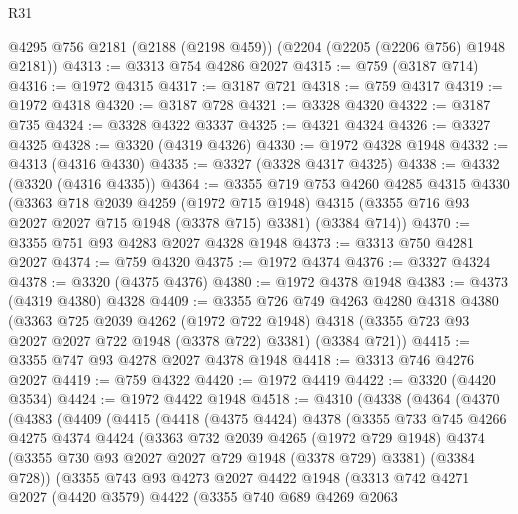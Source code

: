 \begin{lexlean}{R31}
\begin{coremodule}
    @4295
    @756
    @2181
    (@2188 (@2198 @459))
    (@2204 (@2205 (@2206 @756) @1948 @2181))
@4313 := @3313 @754 @4286 @2027
@4315 := @759 (@3187 @714)
@4316 := @1972 @4315
@4317 := @3187 @721
@4318 := @759 @4317
@4319 := @1972 @4318
@4320 := @3187 @728
@4321 := @3328 @4320
@4322 := @3187 @735
@4324 := @3328 @4322 @3337
@4325 := @4321 @4324
@4326 := @3327 @4325
@4328 := @3320 (@4319 @4326)
@4330 := @1972 @4328 @1948
@4332 := @4313 (@4316 @4330)
@4335 := @3327 (@3328 @4317 @4325)
@4338 := @4332 (@3320 (@4316 @4335))
@4364 := @3355
    @719
    @753
    @4260
    @4285
    @4315
    @4330
    (@3363
      @718
      @2039
      @4259
      (@1972 @715 @1948)
      @4315
      (@3355 @716 @93 @2027 @2027 @715 @1948 (@3378 @715) @3381)
      (@3384 @714))
@4370 := @3355 @751 @93 @4283 @2027 @4328 @1948
@4373 := @3313 @750 @4281 @2027
@4374 := @759 @4320
@4375 := @1972 @4374
@4376 := @3327 @4324
@4378 := @3320 (@4375 @4376)
@4380 := @1972 @4378 @1948
@4383 := @4373 (@4319 @4380) @4328
@4409 := @3355
    @726
    @749
    @4263
    @4280
    @4318
    @4380
    (@3363
      @725
      @2039
      @4262
      (@1972 @722 @1948)
      @4318
      (@3355 @723 @93 @2027 @2027 @722 @1948 (@3378 @722) @3381)
      (@3384 @721))
@4415 := @3355 @747 @93 @4278 @2027 @4378 @1948
@4418 := @3313 @746 @4276 @2027
@4419 := @759 @4322
@4420 := @1972 @4419
@4422 := @3320 (@4420 @3534)
@4424 := @1972 @4422 @1948
@4518 := @4310
    (@4338
      (@4364
        (@4370
          (@4383
            (@4409
              (@4415
                (@4418
                  (@4375 @4424)
                  @4378
                  (@3355
                    @733
                    @745
                    @4266
                    @4275
                    @4374
                    @4424
                    (@3363
                      @732
                      @2039
                      @4265
                      (@1972 @729 @1948)
                      @4374
                      (@3355 @730 @93 @2027 @2027 @729 @1948 (@3378 @729) @3381)
                      (@3384 @728))
                    (@3355
                      @743
                      @93
                      @4273
                      @2027
                      @4422
                      @1948
                      (@3313
                        @742
                        @4271
                        @2027
                        (@4420 @3579)
                        @4422
                        (@3355
                          @740
                          @689
                          @4269
                          @2063

\end{coremodule}
\end{lexlean}

